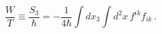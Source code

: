 \begin{equation}
\frac{W}{T} \equiv \frac{S_3}{\hbar} =
- \frac{1}{4\hbar} \int\! dx_3 \int\! d^2x\, f^{ik}f_{ik}\, .
\label{eq45}
\end{equation}

